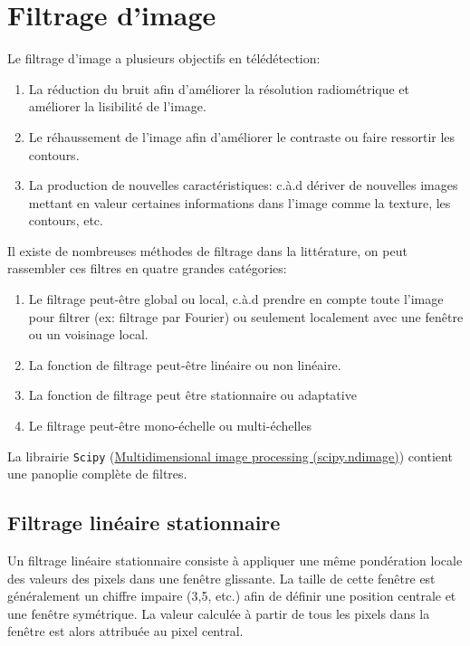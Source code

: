 \documentclass[
  11pt,
  letterpaper,
  open=any,
  twoside=false,
  french]{scrbook}
\begin{document}
\section{Filtrage d'image}\label{filtrage-dimage}

Le filtrage d'image a plusieurs objectifs en télédétection:

\begin{enumerate}
\def\labelenumi{\arabic{enumi}.}
\item
  La réduction du bruit afin d'améliorer la résolution radiométrique et
  améliorer la lisibilité de l'image.
\item
  Le réhaussement de l'image afin d'améliorer le contraste ou faire
  ressortir les contours.
\item
  La production de nouvelles caractéristiques: c.à.d dériver de
  nouvelles images mettant en valeur certaines informations dans l'image
  comme la texture, les contours, etc.
\end{enumerate}

Il existe de nombreuses méthodes de filtrage dans la littérature, on
peut rassembler ces filtres en quatre grandes catégories:

\begin{enumerate}
\def\labelenumi{\arabic{enumi}.}
\item
  Le filtrage peut-être global ou local, c.à.d prendre en compte toute
  l'image pour filtrer (ex: filtrage par Fourier) ou seulement
  localement avec une fenêtre ou un voisinage local.
\item
  La fonction de filtrage peut-être linéaire ou non linéaire.
\item
  La fonction de filtrage peut être stationnaire ou adaptative
\item
  Le filtrage peut-être mono-échelle ou multi-échelles
\end{enumerate}

La librairie \texttt{Scipy}
(\href{https://docs.scipy.org/doc/scipy/reference/ndimage.html}{Multidimensional
image processing (scipy.ndimage)}) contient une panoplie complète de
filtres.

\subsection{Filtrage linéaire
stationnaire}\label{filtrage-linuxe9aire-stationnaire}

Un filtrage linéaire stationnaire consiste à appliquer une même
pondération locale des valeurs des pixels dans une fenêtre glissante. La
taille de cette fenêtre est généralement un chiffre impaire (3,5, etc.)
afin de définir une position centrale et une fenêtre symétrique. La
valeur calculée à partir de tous les pixels dans la fenêtre est alors
attribuée au pixel central.
\end{document}
